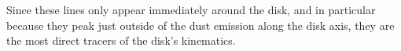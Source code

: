 \documentclass[twocolumn]{aastex62}
\begin{document}
Since these lines only appear immediately around the disk, and in particular
because they peak just outside of the dust emission along the disk axis, they
are the most direct tracers of the disk's kinematics.







\end{document}
